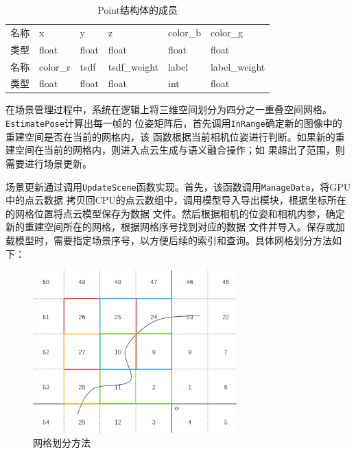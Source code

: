 \begin{table}[htb]
	\centering
	\caption{Point结构体的成员}
	\begin{tabular}{cm{2.2cm}m{2.2cm}m{2.2cm}m{2.2cm}m{2.2cm}}
		\toprule
		名称 & \centering\arraybackslash x        & \centering\arraybackslash y     & \centering\arraybackslash z            & \centering\arraybackslash color\_b & \centering\arraybackslash color\_g      \\
		类型 & \centering\arraybackslash float    & \centering\arraybackslash float & \centering\arraybackslash float        & \centering\arraybackslash float    & \centering\arraybackslash float         \\
		\midrule
		名称 & \centering\arraybackslash color\_r & \centering\arraybackslash tsdf  & \centering\arraybackslash tsdf\_weight & \centering\arraybackslash label    & \centering\arraybackslash label\_weight \\
		类型 & \centering\arraybackslash float    & \centering\arraybackslash float & \centering\arraybackslash float        & \centering\arraybackslash int      & \centering\arraybackslash float         \\
		\bottomrule
	\end{tabular}
	\label{table:point}
\end{table}

\par 在场景管理过程中，系统在逻辑上将三维空间划分为四分之一重叠空间网格。\texttt{EstimatePose}计算出每一帧的
位姿矩阵后，首先调用\texttt{InRange}确定新的图像中的重建空间是否在当前的网格内，该
函数根据当前相机位姿进行判断。如果新的重建空间在当前的网格内，则进入点云生成与语义融合操作；如
果超出了范围，则需要进行场景更新。

\par 场景更新通过调用\texttt{UpdateScene}函数实现。首先，该函数调用\texttt{ManageData}，将GPU中的点云数据
拷贝回CPU的点云数组中，调用模型导入导出模块，根据坐标所在的网格位置将点云模型保存为数据
文件。然后根据相机的位姿和相机内参，确定新的重建空间所在的网格，根据网格序号找到对应的数据
文件并导入。保存或加载模型时，需要指定场景序号，以方便后续的索引和查询。具体网格划分方法如
下：

\begin{figure}[htb]
	\centering
	\includegraphics[width=0.7\textwidth]{figures/spatial_grid.png}
	\caption{网格划分方法}
	\label{fig:spatial_grid}
\end{figure}

